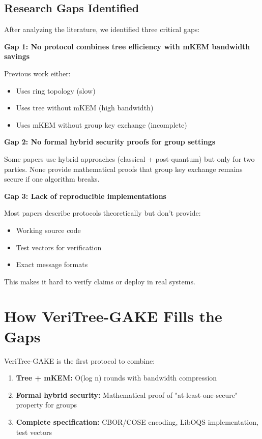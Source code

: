 \documentclass[12pt,a4paper]{report}
\begin{document}
\subsection{Research Gaps Identified}

After analyzing the literature, we identified three critical gaps:

\textbf{Gap 1: No protocol combines tree efficiency with mKEM bandwidth savings}

Previous work either:
\begin{itemize}
\item Uses ring topology (slow)
\item Uses tree without mKEM (high bandwidth)
\item Uses mKEM without group key exchange (incomplete)
\end{itemize}

\textbf{Gap 2: No formal hybrid security proofs for group settings}

Some papers use hybrid approaches (classical + post-quantum) but only for two parties. None provide mathematical proofs that group key exchange remains secure if one algorithm breaks.

\textbf{Gap 3: Lack of reproducible implementations}

Most papers describe protocols theoretically but don't provide:
\begin{itemize}
\item Working source code
\item Test vectors for verification
\item Exact message formats
\end{itemize}

This makes it hard to verify claims or deploy in real systems.

\section{How VeriTree-GAKE Fills the Gaps}

VeriTree-GAKE is the first protocol to combine:
\begin{enumerate}
\item \textbf{Tree + mKEM:} O(log n) rounds with bandwidth compression
\item \textbf{Formal hybrid security:} Mathematical proof of "at-least-one-secure" property for groups
\item \textbf{Complete specification:} CBOR/COSE encoding, LibOQS implementation, test vectors
\end{enumerate}
\end{document}
